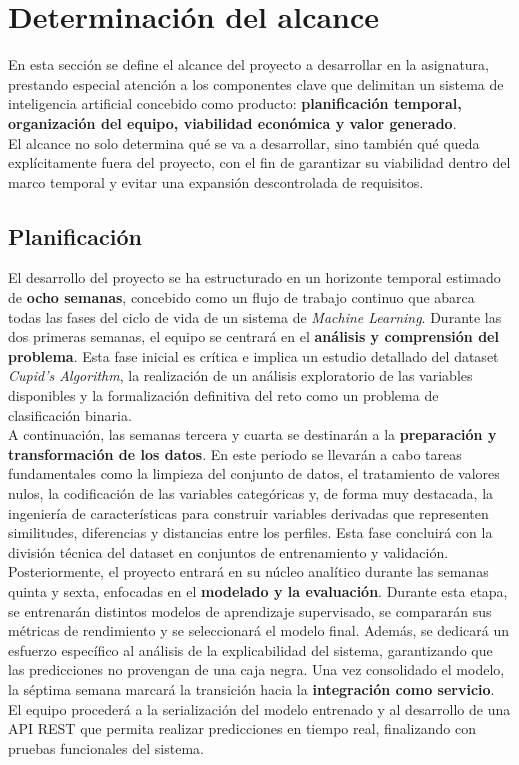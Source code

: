 \section{Determinación del alcance}

En esta sección se define el alcance del proyecto a desarrollar en la asignatura, prestando especial atención a los componentes clave que delimitan un sistema de inteligencia artificial concebido como producto: \textbf{planificación temporal, organización del equipo, viabilidad económica y valor generado}.\\

El alcance no solo determina qué se va a desarrollar, sino también qué queda explícitamente fuera del proyecto, con el fin de garantizar su viabilidad dentro del marco temporal y evitar una expansión descontrolada de requisitos.

\subsection{Planificación}

El desarrollo del proyecto se ha estructurado en un horizonte temporal estimado de \textbf{ocho semanas}, concebido como un flujo de trabajo continuo que abarca todas las fases del ciclo de vida de un sistema de \textit{Machine Learning}. Durante las dos primeras semanas, el equipo se centrará en el \textbf{análisis y comprensión del problema}. Esta fase inicial es crítica e implica un estudio detallado del dataset \textit{Cupid’s Algorithm}, la realización de un análisis exploratorio de las variables disponibles y la formalización definitiva del reto como un problema de clasificación binaria.\\

A continuación, las semanas tercera y cuarta se destinarán a la \textbf{preparación y transformación de los datos}. En este periodo se llevarán a cabo tareas fundamentales como la limpieza del conjunto de datos, el tratamiento de valores nulos, la codificación de las variables categóricas y, de forma muy destacada, la ingeniería de características para construir variables derivadas que representen similitudes, diferencias y distancias entre los perfiles. Esta fase concluirá con la división técnica del dataset en conjuntos de entrenamiento y validación.\\

Posteriormente, el proyecto entrará en su núcleo analítico durante las semanas quinta y sexta, enfocadas en el \textbf{modelado y la evaluación}. Durante esta etapa, se entrenarán distintos modelos de aprendizaje supervisado, se compararán sus métricas de rendimiento y se seleccionará el modelo final. Además, se dedicará un esfuerzo específico al análisis de la explicabilidad del sistema, garantizando que las predicciones no provengan de una caja negra. Una vez consolidado el modelo, la séptima semana marcará la transición hacia la \textbf{integración como servicio}. El equipo procederá a la serialización del modelo entrenado y al desarrollo de una API REST que permita realizar predicciones en tiempo real, finalizando con pruebas funcionales del sistema.\\

